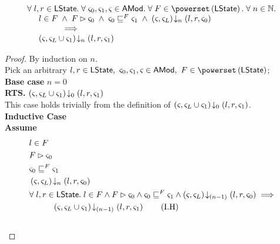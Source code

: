%
%
\begin{lemma}[] \label{lem:amodHiding}
%
\[
\begin{array}{l}
	\for{l, r \in \LState} \for{\amod{0}, \amod{1}, \amod{} \in \AMods} \for{ F \in \pset{\LState}} \for{n \in \Nats} \\
	
	\hspace*{0.5cm} 
	l \in F \;\land\; 
	F \fences \amod{0} \;\land\; 
	\amod{0} \weakenI{F} \amod{1}\;\land\;
	\extendsAMUpto{\amod{}, \amod{L}}{n}{l}{r}{\amod{0}}\\
	
	\hspace*{1.5cm} \implies\\
	
	
	\hspace*{0.5cm}
	\extendsAMUpto{\amod{}, \amod{L} \cup \amod{1}}{n}{l}{r}{\amod{1}}\\
\end{array}
\]
%
\begin{proof}
By induction on $n$. \\
Pick an arbitrary $l, r \in \LState,\ \amod{0}, \amod{1}, \amod{} \in \AMods,\  F \in \pset{\LState}$;\\
\noindent\textbf{Base case} $n = 0$\\
\textbf{RTS. } $\left(\varsigma_{}, \varsigma_{L} \cup \varsigma_{1}\right) \!\downarrow_{0} \left(l, r, \varsigma_{1}\right)$\\
This case holds trivially from the definition of $\left(\varsigma_{}, \varsigma_{L} \cup \varsigma_{1}\right) \!\downarrow_{0} \left(l, r, \varsigma_{1}\right)$.\\

\noindent\textbf{Inductive Case}\\
\textbf{Assume}
\begin{align}
	&l \in F \label{L2:Ass1}\\
	&F \fences \amod{0} \label{L2:Ass2}\\
	&\amod{0} \weakenI{F} \amod{1}\label{L2:Ass4}\\
	& \extendsAMUpto{\amod{}, \amod{L}}{n}{l}{r}{\amod{0}} \label{L2:Ass5}\\
%
	&\for{l, r \in \LState} l \in F \land F \fences \amod{0} \land \amod{0} \weakenI{F} \amod{1} \land \extendsAMUpto{\amod{}, \amod{L}}{(n-1)}{l}{r}{\amod{0}}
	\implies \nonumber\\
	&\hspace*{1cm}\extendsAMUpto{\amod{}, \amod{L} \cup \amod{1}}{(n-1)}{l}{r}{\amod{1}} \tag{I.H}\label{L2:I.H}\\\nonumber
\end{align}


\end{proof}
\end{lemma}
